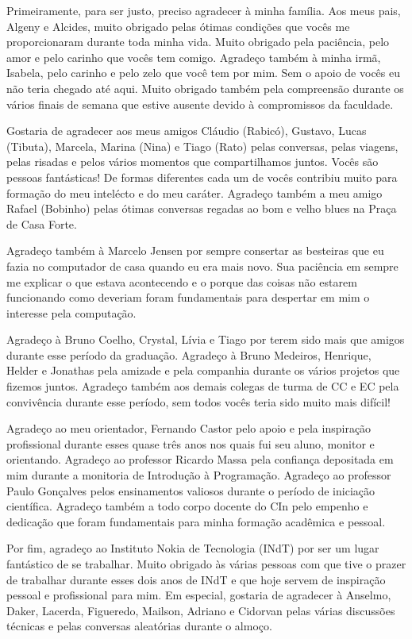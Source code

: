 Primeiramente, para ser justo, preciso agradecer à minha família. Aos meus pais, Algeny e Alcides, muito obrigado pelas ótimas condições que vocês me proporcionaram durante toda minha vida. Muito obrigado pela paciência, pelo amor e pelo carinho que vocês tem comigo. Agradeço também à minha irmã, Isabela, pelo carinho e pelo zelo que você tem por mim. Sem o apoio de vocês eu não teria chegado até aqui. Muito obrigado também pela compreensão durante os vários finais de semana que estive ausente devido à compromissos da faculdade.

Gostaria de agradecer aos meus amigos Cláudio (Rabicó), Gustavo, Lucas (Tibuta), Marcela, Marina (Nina) e Tiago (Rato) pelas conversas, pelas viagens, pelas risadas e pelos vários momentos que compartilhamos juntos. Vocês são pessoas fantásticas! De formas diferentes cada um de vocês contribiu muito para formação do meu intelécto e do meu caráter. Agradeço também a meu amigo Rafael (Bobinho) pelas ótimas conversas regadas ao bom e velho blues na Praça de Casa Forte.

Agradeço também à Marcelo Jensen por sempre consertar as besteiras que eu fazia no computador de casa quando eu era mais novo. Sua paciência em sempre me explicar o que estava acontecendo e o porque das coisas não estarem funcionando como deveriam foram fundamentais para despertar em mim o interesse pela computação.

Agradeço à Bruno Coelho, Crystal, Lívia e Tiago por terem sido mais que amigos durante esse período da graduação. Agradeço à Bruno Medeiros, Henrique, Helder e Jonathas pela amizade e pela companhia durante os vários projetos que fizemos juntos. Agradeço também aos demais colegas de turma de CC e EC pela convivência durante esse período, sem todos vocês teria sido muito mais difícil!

Agradeço ao meu orientador, Fernando Castor pelo apoio e pela inspiração profissional durante esses quase três anos nos quais fui seu aluno, monitor e orientando. Agradeço ao professor Ricardo Massa pela confiança depositada em mim durante a monitoria de Introdução à Programação. Agradeço ao professor Paulo Gonçalves pelos ensinamentos valiosos durante o período de iniciação científica. Agradeço também a todo corpo docente do CIn pelo empenho e dedicação que foram fundamentais para minha formação acadêmica e pessoal.

Por fim, agradeço ao Instituto Nokia de Tecnologia (INdT) por ser um lugar fantástico de se trabalhar. Muito obrigado às várias pessoas com que tive o prazer de trabalhar durante esses dois anos de INdT e que hoje servem de inspiração pessoal e profissional para mim. Em especial, gostaria de agradecer à Anselmo, Daker, Lacerda, Figueredo, Mailson, Adriano e Cidorvan pelas várias discussões técnicas e pelas conversas aleatórias durante o almoço.
